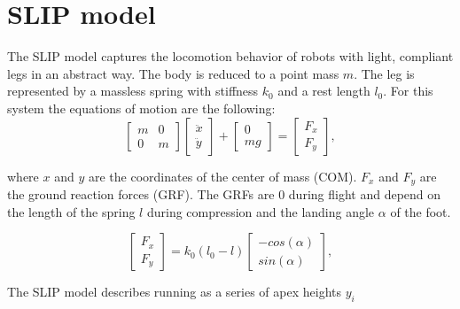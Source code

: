 \documentclass[journal,onecolumn]{IEEEtran}
\begin{document}
	
	
	
	\section{SLIP model}
	\label{sec:SLIP model}
	The SLIP model captures the locomotion behavior of robots with light, compliant legs in an abstract way. The body is reduced to a point mass \( m \). The
	leg is represented by a massless spring with stiffness \({k}_0 \) and a rest length \({l}_0 \). For this system the equations of motion are the following:
	\begin{equation}
	\begin{bmatrix} m & 0 \\ 0 & m \end{bmatrix}
	\begin{bmatrix} \ddot{x} \\ \ddot{y} \end{bmatrix}
	+
	\begin{bmatrix} 0 \\ mg \end{bmatrix}
	=
	\begin{bmatrix} {F}_{x} \\ {F}_{y} \end{bmatrix},
	\label{eq:equation of motion}
	\end{equation}
	
	where \(x\) and \(y\) are the coordinates of the center of mass (COM). \({F}_x \) and \({F}_y \) are the ground reaction forces (GRF). The GRFs are 0 during flight and depend 
	on the length of the spring \(l\) during compression and the landing angle \(\alpha\) of the foot.
	
	\begin{equation}
	\begin{bmatrix} {F}_{x}  \\ {F}_{y}  \end{bmatrix}
	=
	{k}_{0} ({l}_{0} -l)
	\begin{bmatrix} -cos(\alpha) \\ sin(\alpha) \end{bmatrix},
	\end{equation}
	
	The SLIP model describes running as a series of apex heights \({y}_i \)
	
\end{document}
